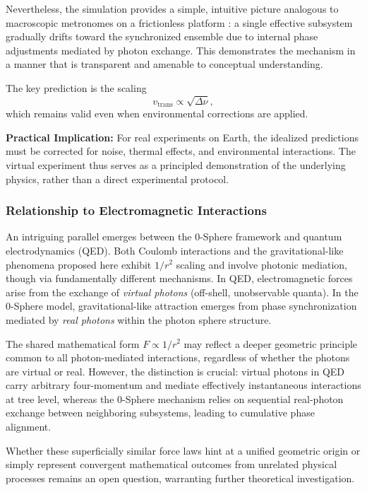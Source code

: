 \documentclass[%
 reprint,
 amsmath,amssymb,
 aps,
 prb,
]{revtex4-2}
\numberwithin{equation}{section}
\begin{document}
Nevertheless, the simulation provides a simple, intuitive picture analogous to macroscopic metronomes on a frictionless platform \cite{Bennett2002}: a single effective subsystem gradually drifts toward the synchronized ensemble due to internal phase adjustments mediated by photon exchange. This demonstrates the mechanism in a manner that is transparent and amenable to conceptual understanding.

The key prediction is the scaling
\begin{equation}
v_\text{trans} \propto \sqrt{\Delta\nu},
\end{equation}
which remains valid even when environmental corrections are applied.

\vspace{0.5cm}

\textbf{Practical Implication:} For real experiments on Earth, the idealized predictions must be corrected for noise, thermal effects, and environmental interactions. The virtual experiment thus serves as a principled demonstration of the underlying physics, rather than a direct experimental protocol.

\subsubsection{Relationship to Electromagnetic Interactions}

An intriguing parallel emerges between the 0-Sphere framework and quantum electrodynamics (QED). Both Coulomb interactions and the gravitational-like phenomena proposed here exhibit $1/r^2$ scaling and involve photonic mediation, though via fundamentally different mechanisms. In QED, electromagnetic forces arise from the exchange of \textit{virtual photons} (off-shell, unobservable quanta). In the 0-Sphere model, gravitational-like attraction emerges from phase synchronization mediated by \textit{real photons} within the photon sphere structure.

The shared mathematical form $F \propto 1/r^2$ may reflect a deeper geometric principle common to all photon-mediated interactions, regardless of whether the photons are virtual or real. However, the distinction is crucial: virtual photons in QED carry arbitrary four-momentum and mediate effectively instantaneous interactions at tree level, whereas the 0-Sphere mechanism relies on sequential real-photon exchange between neighboring subsystems, leading to cumulative phase alignment.

Whether these superficially similar force laws hint at a unified geometric origin or simply represent convergent mathematical outcomes from unrelated physical processes remains an open question, warranting further theoretical investigation.
\end{document}
